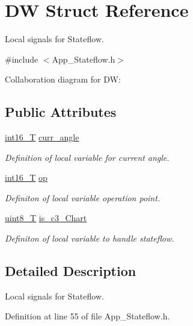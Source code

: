 \hypertarget{struct_d_w}{}\section{DW Struct Reference}
\label{struct_d_w}


Local signals for Stateflow.  




{\ttfamily \#include $<$App\+\_\+\+Stateflow.\+h$>$}



Collaboration diagram for DW\+:
\subsection*{Public Attributes}
\begin{DoxyCompactItemize}
\item 
\mbox{\hyperlink{_app___stateflowtypes_8h_ad73c6af88bb2ce70799e51f639309f21}{int16\+\_\+T}} \mbox{\hyperlink{struct_d_w_ab0801640ad5fc131a2c3e085d9986836}{curr\+\_\+angle}}
\begin{DoxyCompactList}\small\item\em Definition of local variable for current angle. \end{DoxyCompactList}\item 
\mbox{\hyperlink{_app___stateflowtypes_8h_ad73c6af88bb2ce70799e51f639309f21}{int16\+\_\+T}} \mbox{\hyperlink{struct_d_w_a2736d80f513d2e420f13698e8baa6c59}{op}}
\begin{DoxyCompactList}\small\item\em Definiton of local variable operation point. \end{DoxyCompactList}\item 
\mbox{\hyperlink{_app___stateflowtypes_8h_a2532a6244e023eee49f315c10f1f7c53}{uint8\+\_\+T}} \mbox{\hyperlink{struct_d_w_a3b1191ce727da1e17f5a8923eb06ae80}{is\+\_\+c3\+\_\+\+Chart}}
\begin{DoxyCompactList}\small\item\em Definiton of local variable to handle stateflow. \end{DoxyCompactList}\end{DoxyCompactItemize}


\subsection{Detailed Description}
Local signals for Stateflow. 

Definition at line 55 of file App\+\_\+\+Stateflow.\+h.



